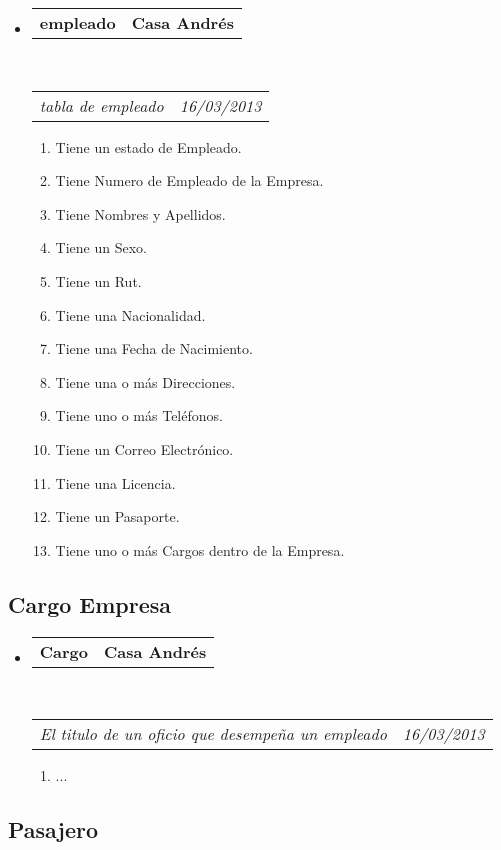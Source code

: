 \documentclass[10pt,letterpaper]{article}
\makeatletter
\newcommand{\headerrow}[2]
{\begin{tabular*}{\linewidth}{l@{\extracolsep{\fill}}r}
	#1 &
	#2 \\
\end{tabular*}}
\makeatother
\begin{document}
\begin{itemize}
	\parskip=0.1em

	\item
	\headerrow
		{\textbf{empleado}}
		{\textbf{Casa Andrés}}
	\\
	\headerrow
		{\emph{tabla de empleado}}
		{\emph{16/03/2013}}
	\begin{enumerate}
		\item Tiene un estado de Empleado.
		\item Tiene Numero de Empleado de la Empresa.
		\item Tiene Nombres y Apellidos.
		\item Tiene un Sexo.
		\item Tiene un Rut.
		\item Tiene una Nacionalidad.
		\item Tiene una Fecha de Nacimiento.
		\item Tiene una o más Direcciones.
		\item Tiene uno o más Teléfonos.
		\item Tiene un Correo Electrónico.
		\item Tiene una Licencia.
		\item Tiene un Pasaporte.
		\item Tiene uno o más Cargos dentro de la Empresa.
		
		
	\end{enumerate}

\end{itemize}


\subsection*{Cargo Empresa}

\begin{itemize}
	\parskip=0.1em

	\item
	\headerrow
		{\textbf{Cargo}}
		{\textbf{Casa Andrés}}
	\\
	\headerrow
		{\emph{El titulo de un oficio que desempeña un empleado}}
		{\emph{16/03/2013}}
	\begin{enumerate}
		\item ...
	\end{enumerate}

\end{itemize}

\subsection*{Pasajero}
\end{document}
